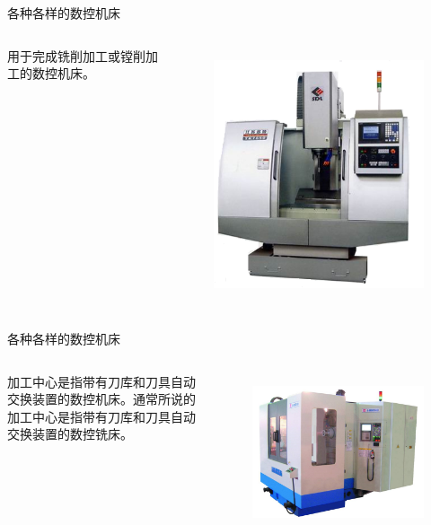 \documentclass[UTF8,zihao=-4]{ctexbeamer}
\begin{document}
\begin{frame}{各种各样的数控机床}
\begin{columns}
	用于完成铣削加工或镗削加工的数控机床。
	
	\begin{figure}
		\centering
		\includegraphics[width= 0.8\linewidth]{image/1-2}
		\label{fig:1-2}
	\end{figure}
\end{columns}
\end{frame}

\begin{frame}{各种各样的数控机床}
\begin{columns}
	加工中心是指带有刀库和刀具自动交换装置的数控机床。通常所说的加工中心是指带有刀库和刀具自动交换装置的数控铣床。
	
	\begin{figure}
		\centering
		\includegraphics[width= 0.8\linewidth]{image/1-3}
		\label{fig:1-3}
	\end{figure}
\end{columns}
\end{frame}
\end{document}
